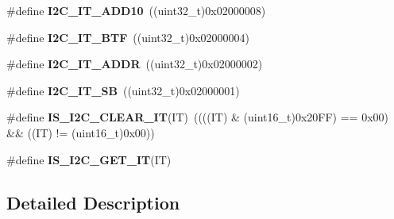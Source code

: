 \begin{DoxyCompactItemize}
\item 
\hypertarget{group___i2_c__interrupts__definition_ga8a9bc5a1dee3bbd41347b19cf117c0f3}{\#define {\bfseries I2\-C\-\_\-\-I\-T\-\_\-\-A\-D\-D10}~((uint32\-\_\-t)0x02000008)}\label{group___i2_c__interrupts__definition_ga8a9bc5a1dee3bbd41347b19cf117c0f3}

\item 
\hypertarget{group___i2_c__interrupts__definition_gaef469fef934f655614b7cffd00b87ceb}{\#define {\bfseries I2\-C\-\_\-\-I\-T\-\_\-\-B\-T\-F}~((uint32\-\_\-t)0x02000004)}\label{group___i2_c__interrupts__definition_gaef469fef934f655614b7cffd00b87ceb}

\item 
\hypertarget{group___i2_c__interrupts__definition_gaf68f1eda33dcb13626597f477d044025}{\#define {\bfseries I2\-C\-\_\-\-I\-T\-\_\-\-A\-D\-D\-R}~((uint32\-\_\-t)0x02000002)}\label{group___i2_c__interrupts__definition_gaf68f1eda33dcb13626597f477d044025}

\item 
\hypertarget{group___i2_c__interrupts__definition_gaec2fb9bbd0e1b128b4450b2a7b312896}{\#define {\bfseries I2\-C\-\_\-\-I\-T\-\_\-\-S\-B}~((uint32\-\_\-t)0x02000001)}\label{group___i2_c__interrupts__definition_gaec2fb9bbd0e1b128b4450b2a7b312896}

\item 
\hypertarget{group___i2_c__interrupts__definition_ga368c05fc9aadd7bb4d23280791b5a751}{\#define {\bfseries I\-S\-\_\-\-I2\-C\-\_\-\-C\-L\-E\-A\-R\-\_\-\-I\-T}(I\-T)~((((I\-T) \& (uint16\-\_\-t)0x20\-F\-F) == 0x00) \&\& ((\-I\-T) != (uint16\-\_\-t)0x00))}\label{group___i2_c__interrupts__definition_ga368c05fc9aadd7bb4d23280791b5a751}

\item 
\#define {\bfseries I\-S\-\_\-\-I2\-C\-\_\-\-G\-E\-T\-\_\-\-I\-T}(I\-T)
\end{DoxyCompactItemize}


\subsection{Detailed Description}


